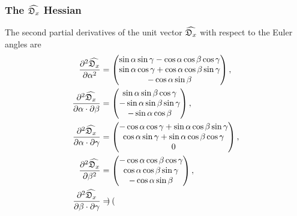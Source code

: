 \subsubsection{The $\widehat{\mathfrak{D}_x}$ Hessian}

The second partial derivatives of the unit vector $\widehat{\mathfrak{D}_x}$ with respect to the Euler angles are
\begin{subequations}
\begin{align}
    \frac{\partial^2 \widehat{\mathfrak{D}_x}}{\partial \alpha^2} &= \begin{pmatrix}
        \sin \alpha \sin \gamma - \cos \alpha \cos \beta \cos \gamma \\
        \sin \alpha \cos \gamma + \cos \alpha \cos \beta \sin \gamma \\
        -\cos \alpha \sin \beta \\
    \end{pmatrix}, \\
    \frac{\partial^2 \widehat{\mathfrak{D}_x}}{\partial \alpha \cdot \partial \beta} &= \begin{pmatrix}
        \sin \alpha \sin \beta \cos \gamma \\
        - \sin \alpha \sin \beta \sin \gamma \\
        -\sin \alpha \cos \beta \\
    \end{pmatrix}, \\
    \frac{\partial^2 \widehat{\mathfrak{D}_x}}{\partial \alpha \cdot \partial \gamma} &= \begin{pmatrix}
        -\cos \alpha \cos \gamma + \sin \alpha \cos \beta \sin \gamma \\
        \cos \alpha \sin \gamma + \sin \alpha \cos \beta \cos \gamma \\
        0 \\
    \end{pmatrix}, \\
    \frac{\partial^2 \widehat{\mathfrak{D}_x}}{\partial \beta^2} &= \begin{pmatrix}
        -\cos \alpha \cos \beta \cos \gamma \\
        \cos \alpha \cos \beta \sin \gamma \\
        -\cos \alpha \sin \beta \\
    \end{pmatrix}, \\
    \frac{\partial^2 \widehat{\mathfrak{D}_x}}{\partial \beta \cdot \partial \gamma} &= \begin{pmatrix}

\end{pmatrix}
\end{align}
\end{subequations}
